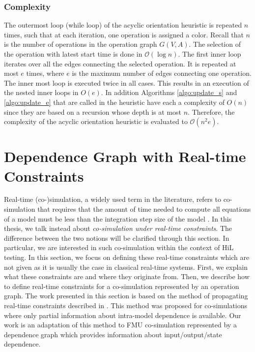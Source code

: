 \subsubsection{Complexity}

The outermost loop (while loop) of the acyclic orientation heuristic is repeated $n$ times, such that at each iteration, one operation is assigned a color. Recall that $n$ is the number of operations in the operation graph $G(V,A)$. The selection of the operation with latest start time is done in $\mathcal{O}(\log{}n)$. The first inner loop iterates over all the edges connecting the selected operation. It is repeated at most $e$ times, where $e$ is the maximum number of edges connecting one operation. The inner most loop is executed twice in all cases. This results in an execution of the nested inner loops in $O(e)$. In addition Algorithms \ref{algo:update_s} and \ref{algo:update_e} that are called in the heuristic have each a complexity of $O(n)$ since they are based on a recursion whose depth is at most $n$. Therefore, the complexity of the acyclic orientation heuristic is evaluated to $\mathcal{O}(n^2e)$.  


%
%

\section{\label{sec:grphrtsc}Dependence Graph with Real-time Constraints}

Real-time (co-)simulation, a widely used term in the literature, refers to co-simulation that requires that the amount of time needed to compute all equations of a model must be less than the integration step size of the model \cite{belanger:2010}. In this thesis, we talk instead about \textit{co-simulation under real-time constraints}. The difference between the two notions will be clarified through this section. In particular, we are interested in such co-simulation within the context of HiL testing. In this section, we focus on defining these real-time constraints which are not given as it is usually the case in classical real-time systems. First, we explain what these constraints are and where they originate from. Then, we describe how to define real-time constraints for a co-simulation represented by an operation graph. The work presented in this section is based on the method of propagating real-time constraints described in \cite{faure:2011}. This method was proposed for co-simulations where only partial information about intra-model dependence is available. Our work is an adaptation of this method to FMU co-simulation represented by a dependence graph which provides information about input/output/state dependence.

